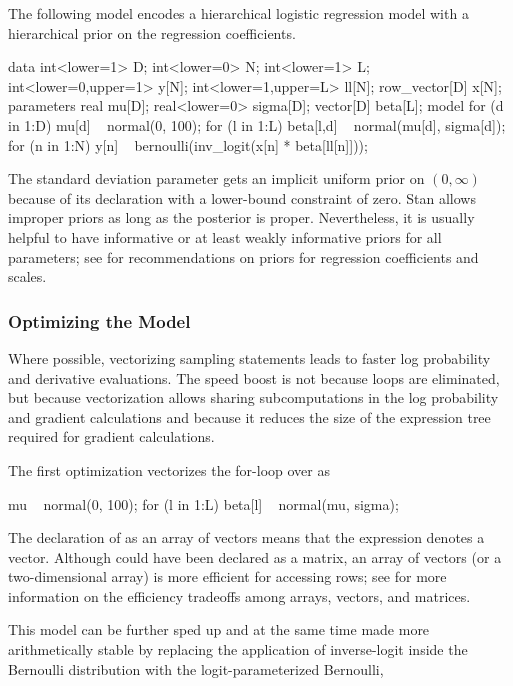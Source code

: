 The following model encodes a hierarchical logistic regression model
with a hierarchical prior on the regression coefficients.
%

\begin{stancode}
data {
  int<lower=1> D;
  int<lower=0> N;
  int<lower=1> L;
  int<lower=0,upper=1> y[N];
  int<lower=1,upper=L> ll[N];
  row_vector[D] x[N];
}
parameters {
  real mu[D];
  real<lower=0> sigma[D];
  vector[D] beta[L];
}
model {
  for (d in 1:D) {
    mu[d] ~ normal(0, 100);
    for (l in 1:L)
      beta[l,d] ~ normal(mu[d], sigma[d]);
  }
  for (n in 1:N)
    y[n] ~ bernoulli(inv_logit(x[n] * beta[ll[n]]));
}
\end{stancode}
%
The standard deviation parameter  gets an implicit uniform
prior on $(0,\infty)$ because of its declaration with a lower-bound
constraint of zero.  Stan allows improper priors as long as the
posterior is proper.  Nevertheless, it is usually helpful to have
informative or at least weakly informative priors for all parameters;
see  for recommendations on priors for
regression coefficients and scales.

\subsubsection{Optimizing the Model}

Where possible, vectorizing sampling statements leads to faster log
probability and derivative evaluations.  The speed boost is not
because loops are eliminated, but because vectorization allows sharing
subcomputations in the log probability and gradient calculations and
because it reduces the size of the expression tree required for
gradient calculations.

The first optimization vectorizes the for-loop over  as
%

\begin{stancode}
  mu ~ normal(0, 100);
  for (l in 1:L)
    beta[l] ~ normal(mu, sigma);
\end{stancode}
%
The declaration of  as an array of vectors means that the
expression  denotes a vector.  Although 
could have been declared as a matrix, an array of vectors (or a
two-dimensional array) is more efficient for accessing rows; see
 for more information on the efficiency
tradeoffs among arrays, vectors, and matrices.

This model can be further sped up and at the same time made more
arithmetically stable by replacing the application of inverse-logit
inside the Bernoulli distribution with the logit-parameterized
Bernoulli,
%

